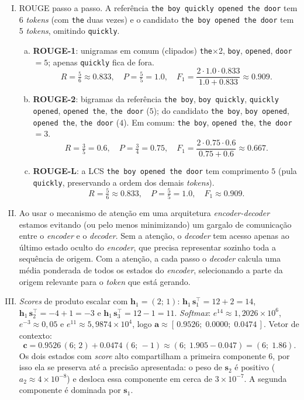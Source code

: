 \documentclass{dlproblemset}
\begin{document}
\begin{enumerate}[I)]
\item ROUGE passo a passo. A referência \texttt{the boy quickly opened the door} tem 6
\textit{tokens} (com \texttt{the} duas vezes) e o candidato \texttt{the boy opened the door}
tem 5 \textit{tokens}, omitindo \texttt{quickly}.
\begin{enumerate}[(a)]
    \item \textbf{ROUGE-1}: unigramas em comum (clipados) \texttt{the}$\times$2, \texttt{boy},
    \texttt{opened}, \texttt{door} $= 5$; apenas \texttt{quickly} fica de fora.
    \[
        R = \tfrac{5}{6} \approx 0.833, \quad P = \tfrac{5}{5} = 1.0, \quad
        F_1 = \frac{2 \cdot 1.0 \cdot 0.833}{1.0 + 0.833} \approx 0.909.
    \]
    \item \textbf{ROUGE-2}: bigramas da referência \texttt{the boy}, \texttt{boy quickly},
    \texttt{quickly opened}, \texttt{opened the}, \texttt{the door} ($5$); do candidato
    \texttt{the boy}, \texttt{boy opened}, \texttt{opened the}, \texttt{the door} ($4$). Em
    comum: \texttt{the boy}, \texttt{opened the}, \texttt{the door} $= 3$.
    \[
        R = \tfrac{3}{5} = 0.6, \quad P = \tfrac{3}{4} = 0.75, \quad
        F_1 = \frac{2 \cdot 0.75 \cdot 0.6}{0.75 + 0.6} \approx 0.667.
    \]
    \item \textbf{ROUGE-L}: a LCS \texttt{the boy opened the door} tem comprimento $5$ (pula
    \texttt{quickly}, preservando a ordem dos demais \textit{tokens}).
    \[
        R = \tfrac{5}{6} \approx 0.833, \quad P = \tfrac{5}{5} = 1.0, \quad
        F_1 \approx 0.909.
    \]
\end{enumerate}

\item Ao usar o mecanismo de atenção em uma arquitetura \textit{encoder-decoder} estamos
evitando (ou pelo menos minimizando) um gargalo de comunicação entre o \textit{encoder} e o
\textit{decoder}. Sem a atenção, o \textit{decoder} tem acesso apenas ao último estado oculto
do \textit{encoder}, que precisa representar sozinho toda a sequência de origem. Com a atenção,
a cada passo o \textit{decoder} calcula uma média ponderada de todos os estados do
\textit{encoder}, selecionando a parte da origem relevante para o \textit{token} que está
gerando.

\item \textit{Scores} de produto escalar com $\mathbf{h}_1 = (2;\, 1)$:
$\mathbf{h}_1\,\mathbf{s}_1^{\top} = 12 + 2 = 14$,
$\mathbf{h}_1\,\mathbf{s}_2^{\top} = -4 + 1 = -3$ e
$\mathbf{h}_1\,\mathbf{s}_3^{\top} = 12 - 1 = 11$. \textit{Softmax}: $e^{14} \approx 1{,}2026 \times 10^{6}$,
$e^{-3} \approx 0{,}05$ e $e^{11} \approx 5{,}9874 \times 10^{4}$, logo
$\mathbf{a} \approx [\,0.9526;\; 0.0000;\; 0.0474\,]$. Vetor de contexto:
\[
    \mathbf{c} = 0.9526\,(6;\, 2) + 0.0474\,(6;\, -1)
    \approx (6;\; 1.905 - 0.047) = (6;\; 1.86).
\]
Os dois estados com \textit{score} alto compartilham a primeira componente $6$, por isso ela
se preserva até a precisão apresentada: o peso de $\mathbf{s}_2$ é positivo ($a_2 \approx 4 \times 10^{-8}$) e
desloca essa componente em cerca de $3 \times 10^{-7}$. A segunda componente é dominada por $\mathbf{s}_1$.

\end{enumerate}
\color{black}
\end{document}
